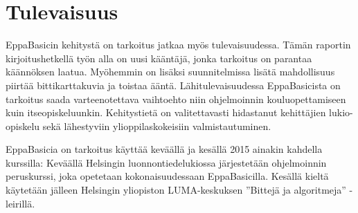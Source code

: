\section{Tulevaisuus}
EppaBasicin kehitystä on tarkoitus
jatkaa myös tulevaisuudessa.
Tämän raportin kirjoitushetkellä työn alla
on uusi kääntäjä,
jonka tarkoitus on parantaa käännöksen laatua.
Myöhemmin on lisäksi suunnitelmissa lisätä
mahdollisuus piirtää bittikarttakuvia
ja toistaa ääntä.
Lähitulevaisuudessa EppaBasicista on tarkoitus
saada varteenotettava vaihtoehto niin ohjelmoinnin
kouluopettamiseen kuin itseopiskeluunkin.
Kehitystietä on valitettavasti hidastanut kehittäjien
lukio-opiskelu sekä lähestyviin ylioppilaskokeisiin
valmistautuminen.

EppaBasicia on tarkoitus käyttää keväällä
ja kesällä 2015 ainakin kahdella kurssilla:
Keväällä Helsingin luonnontiedelukiossa
järjestetään ohjelmoinnin peruskurssi,
joka opetetaan kokonaisuudessaan
EppaBasicilla.
Kesällä kieltä käytetään jälleen
Helsingin yliopiston LUMA-keskuksen
''Bittejä ja algoritmeja'' -leirillä.